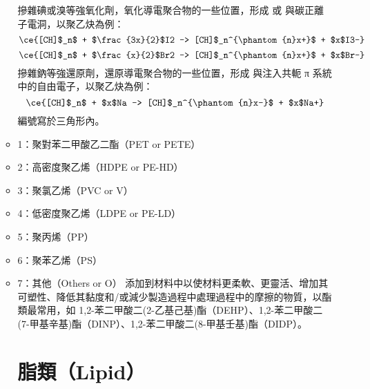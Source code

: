 \documentclass[a4paper,12pt]{report}
\begin{document}
\begin{itemize}
\begin{itemize}
摻雜碘或溴等強氧化劑，氧化導電聚合物的一些位置，形成  或  與碳正離子電洞，以聚乙炔為例：
\[\ce{[CH]$_n$ + $\frac{3x}{2}$I2 -> [CH]$_n^{\phantom{n}x+}$ + $x$I3-}\]
\[\ce{[CH]$_n$ + $\frac{x}{2}$Br2 -> [CH]$_n^{\phantom{n}x+}$ + $x$Br-}\]
摻雜鈉等強還原劑，還原導電聚合物的一些位置，形成  與注入共軛 π 系統中的自由電子，以聚乙炔為例：
\[\ce{[CH]$_n$ + $x$Na -> [CH]$_n^{\phantom{n}x-}$ + $x$Na+}\]
編號寫於三角形內。
\bit
\item 1：聚對苯二甲酸乙二酯（PET or PETE）
\item 2：高密度聚乙烯（HDPE or PE-HD）
\item 3：聚氯乙烯（PVC or V）
\item 4：低密度聚乙烯（LDPE or PE-LD）
\item 5：聚丙烯（PP）
\item 6：聚苯乙烯（PS）
\item 7：其他（Others or O）
\eit
{}
添加到材料中以使材料更柔軟、更靈活、增加其可塑性、降低其黏度和/或減少製造過程中處理過程中的摩擦的物質，以酯類最常用，如 1,2-苯二甲酸二(2-乙基己基)酯（DEHP）、1,2-苯二甲酸二(7-甲基辛基)酯（DINP）、1,2-苯二甲酸二(8-甲基壬基)酯（DIDP）。


\section{脂類（Lipid）}

\end{itemize}
\end{itemize}
\end{document}
